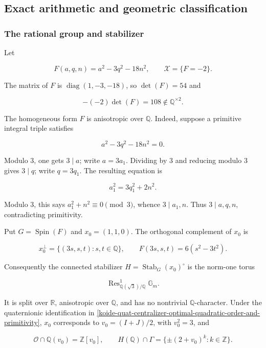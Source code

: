 \subsection{Exact arithmetic and geometric classification}\label{koide-lit-exact-arithmetic-and-geometric-classification}

\subsubsection{The rational group and stabilizer}\label{koide-lit-the-rational-group-and-stabilizer}

Let

\[
 F(a,q,n)=a^2-3q^2-18n^2,
 \qquad \mathscr X=\{F=-2\}.
\]

The matrix of \(F\) is \(\operatorname{diag}(1,-3,-18)\), so \(\det(F)=54\) and

\[
 -(-2)\det(F)=108\notin\mathbb Q^{\times2}.
\]

The homogeneous form \(F\) is anisotropic over \(\mathbb Q\). Indeed, suppose a primitive integral triple satisfies

\[
 a^2-3q^2-18n^2=0.
\]

Modulo \(3\), one gets \(3\mid a\); write \(a=3a_1\). Dividing by \(3\) and reducing modulo \(3\) gives \(3\mid q\); write \(q=3q_1\). The resulting equation is

\[
 a_1^2=3q_1^2+2n^2.
\]

Modulo \(3\), this says \(a_1^2+n^2\equiv0\pmod3\), whence \(3\mid a_1,n\). Thus \(3\mid a,q,n\), contradicting primitivity.

Put \(G=\operatorname{Spin}(F)\) and \(x_0=(1,1,0)\). The orthogonal complement of \(x_0\) is

\[
 x_0^\perp=\{(3s,s,t):s,t\in\mathbb Q\},
 \qquad F(3s,s,t)=6(s^2-3t^2).
\]

Consequently the connected stabilizer \(H=\operatorname{Stab}_G(x_0)^\circ\) is the norm-one torus

\[
 \operatorname{Res}^{1}_{\mathbb Q(\sqrt3)/\mathbb Q}\mathbb G_m.
\]

It is split over \(\mathbb R\), anisotropic over \(\mathbb Q\), and has no
nontrivial \(\mathbb Q\)-character.  Under the quaternionic identification
in \cref{koide-quat-centralizer-optimal-quadratic-order-and-primitivity},
\(x_0\) corresponds to \(v_0=(I+J)/2\), with \(v_0^2=3\), and

\[
 \mathcal O\cap\mathbb Q(v_0)=\mathbb Z[v_0],
 \qquad
 H(\mathbb Q)\cap\Gamma
 =\{\pm(2+v_0)^k:k\in\mathbb Z\}.
\]

